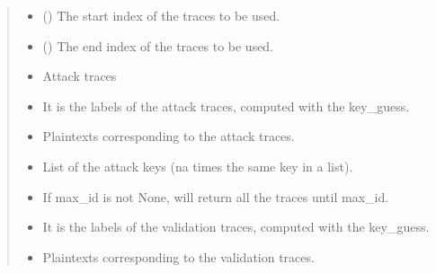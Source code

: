 \documentclass[letterpaper,10pt,english]{sphinxmanual}
\begin{document}
\begin{fulllineitems}
\begin{fulllineitems}
\begin{quote}
\begin{description}
\begin{itemize}
\item {} 
\sphinxAtStartPar
{} (\sphinxstyleliteralemphasis{\sphinxupquote{, }}) \textendash{} The start index of the traces to be used.

\item {} 
\sphinxAtStartPar
{} (\sphinxstyleliteralemphasis{\sphinxupquote{, }}) \textendash{} The end index of the traces to be used.

\end{itemize}

\sphinxAtStartPar
\begin{itemize}
\item {} 
\sphinxAtStartPar
{} \textendash{} Attack traces

\item {} 
\sphinxAtStartPar
{} \textendash{} It is the labels of the attack traces, computed with the key\_guess.

\item {} 
\sphinxAtStartPar
{} \textendash{} Plaintexts corresponding to the attack traces.

\item {} 
\sphinxAtStartPar
{} \textendash{} List of the attack keys (na times the same key in a list).

\item {} 
\sphinxAtStartPar
{} \textendash{} If max\_id is not None, will return all the traces until max\_id.

\item {} 
\sphinxAtStartPar
{} \textendash{} It is the labels of the validation traces, computed with the key\_guess.

\item {} 
\sphinxAtStartPar
{} \textendash{} Plaintexts corresponding to the validation traces.

\end{itemize}



\end{description}
\end{quote}
\end{fulllineitems}
\end{fulllineitems}
\end{document}
